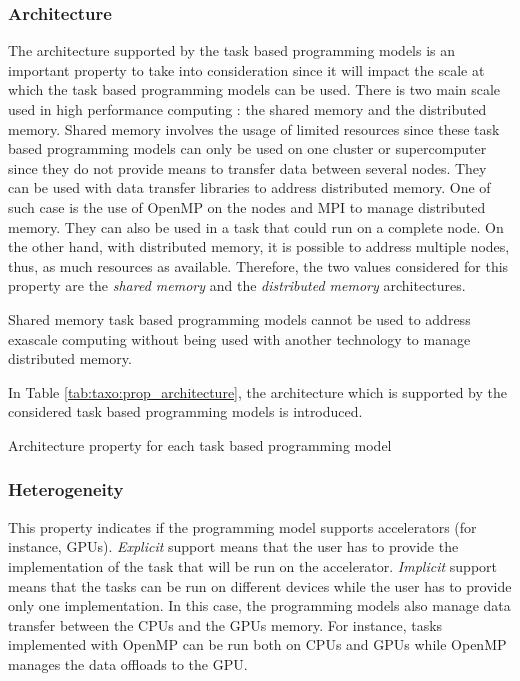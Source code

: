 \subsubsection{Architecture}
The architecture supported by the task based programming models is an important property to take into consideration since it will impact the scale at which the task based programming models can be used.
There is two main scale used in high performance computing : the shared memory and the distributed memory.
Shared memory involves the usage of limited resources since these task based programming models can only be used on one cluster or supercomputer since they do not provide means to transfer data between several nodes.
They can be used with data transfer libraries to address distributed memory.
One of such case is the use of OpenMP on the nodes and MPI to manage distributed memory.
They can also be used in a task that could run on a complete node.
On the other hand, with distributed memory, it is possible to address multiple nodes, thus, as much resources as available.
Therefore, the two values considered for this property are the \textit{shared memory} and the \textit{distributed memory} architectures.

Shared memory task based programming models cannot be used to address exascale computing without being used with another technology to manage distributed memory.

In Table \ref{tab:taxo:prop_architecture}, the architecture which is supported by the considered task based programming models is introduced.

\begin{table}[H]
	\caption{Architecture property for each task based programming model \label{tab:taxo:prop_architecture}}
	\centering
	\begin{multicols}{2}
		

		
	\end{multicols}
\end{table}

\subsubsection{Heterogeneity}
This property indicates if the programming model supports accelerators (for instance, GPUs).
\textit{Explicit} support means that the user has to provide the implementation of the task that will be run on the accelerator.
\textit{Implicit} support means that the tasks can be run on different devices while the user has to provide only one implementation.
In this case, the programming models also manage data transfer between the CPUs and the GPUs memory.
For instance, tasks implemented with OpenMP can be run both on CPUs and GPUs while OpenMP manages the data offloads to the GPU.

